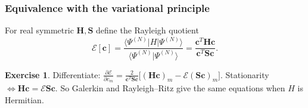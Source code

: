 \documentclass[11pt,a4paper]{article}
\numberwithin{equation}{section}
\theoremstyle{definition}
\newtheorem{exercise}[definition]{Exercise}
\theoremstyle{plain}
\theoremstyle{remark}
\numberwithin{algorithm}{section}
\newcommand{\braket}[2]{\langle #1|#2\rangle}
\newcommand{\ME}[3]{\langle #1|#2|#3\rangle}
\newcommand{\mH}{\mathbf H}
\newcommand{\mS}{\mathbf S}
\newcommand{\vc}{\bm c}
\begin{document}
\subsubsection{Equivalence with the variational principle}
For real symmetric $\mH,\mS$ define the Rayleigh quotient
\begin{equation}
\mathcal E[\vc]=\frac{\ME{\Psi^{(N)}}{H}{\Psi^{(N)}}}{\braket{\Psi^{(N)}}{\Psi^{(N)}}}=\frac{\vc^T\mH\vc}{\vc^T\mS\vc}.
\end{equation}
\begin{exercise}
Differentiate: $\frac{\partial\mathcal E}{\partial c_m}=\frac{2}{\vc^T\mS\vc}\big[(\mH\vc)_m-\mathcal E(\mS\vc)_m\big]$. Stationarity $\Leftrightarrow\mH\vc=\mathcal E\mS\vc$. So Galerkin and Rayleigh--Ritz give the same equations when $H$ is Hermitian.
\end{exercise}
\end{document}
